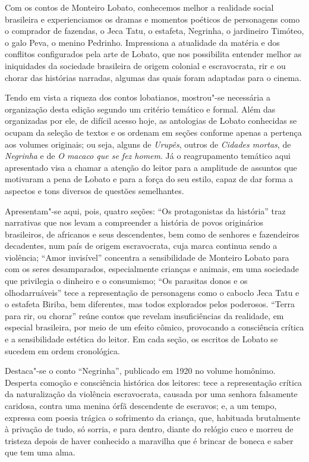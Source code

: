 Com os contos de Monteiro Lobato, conhecemos melhor a realidade social
brasileira e experienciamos os dramas e momentos poéticos de personagens
como o comprador de fazendas, o Jeca Tatu, o estafeta, Negrinha, o
jardineiro Timóteo, o galo Peva, o menino Pedrinho. Impressiona a
atualidade da matéria e dos conflitos configurados pela arte de Lobato,
que nos possibilita entender melhor as iniquidades da sociedade
brasileira de origem colonial e escravocrata, rir e ou chorar das
histórias narradas, algumas das quais foram adaptadas para o cinema.

Tendo em vista a riqueza dos contos lobatianos, mostrou"-se necessária a
organização desta edição segundo um critério temático e formal. Além das
organizadas por ele, de difícil acesso hoje, as antologias de Lobato
conhecidas se ocupam da seleção de textos e os ordenam em seções
conforme apenas a pertença aos volumes originais; ou seja, alguns de
\emph{Urupês}, outros de \emph{Cidades mortas}, de \emph{Negrinha} e de
\emph{O macaco que se fez homem}. Já o reagrupamento temático aqui
apresentado visa a chamar a atenção do leitor para a amplitude de
assuntos que motivaram a pena de Lobato e para a força do seu estilo,
capaz de dar forma a aspectos e tons diversos de questões semelhantes.

Apresentam"-se aqui, pois, quatro seções: ``Os protagonistas da
história'' traz narrativas que nos levam a compreender a história de
povos originários brasileiros, de africanos e seus descendentes, bem
como de senhores e fazendeiros decadentes, num país de origem
escravocrata, cuja marca continua sendo a violência; ``Amor invisível''
concentra a sensibilidade de Monteiro Lobato para com os seres
desamparados, especialmente crianças e animais, em uma sociedade que
privilegia o dinheiro e o consumismo; ``Os parasitas donos e os
olhodarruáveis'' tece a representação de personagens como o caboclo Jeca
Tatu e o estafeta Biriba, bem diferentes, mas todos explorados pelos
poderosos. ``Terra para rir, ou chorar'' reúne contos que revelam
insuficiências da realidade, em especial brasileira, por meio de um
efeito cômico, provocando a consciência crítica e a sensibilidade
estética do leitor. Em cada seção, os escritos de Lobato se sucedem em
ordem cronológica.

Destaca"-se o conto ``Negrinha'', publicado em 1920 no volume homônimo.
Desperta comoção e consciência histórica dos leitores: tece a
representação crítica da naturalização da violência escravocrata,
causada por uma senhora falsamente caridosa, contra uma menina órfã
descendente de escravos; e, a um tempo, expressa com poesia trágica o
sofrimento da criança, que, habituada brutalmente à privação de tudo, só
sorria, e para dentro, diante do relógio cuco e morreu de tristeza
depois de haver conhecido a maravilha que é brincar de boneca e saber
que tem uma alma.

